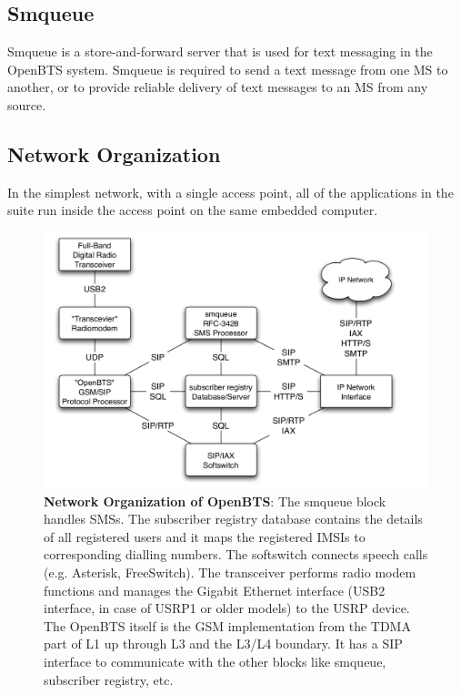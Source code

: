 \subsection{Smqueue}
Smqueue is a store-and-forward server that is used for text messaging in the OpenBTS system. Smqueue is required to send a text message from one MS to another, or to provide reliable delivery of text messages to an MS from any source.

\subsection{Network Organization}
In the simplest network, with a single access point, all of the applications in the suite run inside the access point on the same embedded computer.



\begin{figure}[h]
\centering
\includegraphics[width=1\textwidth]{networkOrg}
\caption[Network Organization of OpenBTS]{\textbf{Network Organization of OpenBTS}: The smqueue block handles SMSs. 
The subscriber registry database contains the details of all registered users and it
maps the registered IMSIs to corresponding dialling numbers. The softswitch connects 
speech calls (e.g. Asterisk, FreeSwitch). The transceiver performs radio modem
functions and manages the Gigabit Ethernet interface (USB2 interface, in case
of USRP1 or older models) to the USRP device. The OpenBTS itself is the GSM 
implementation from the TDMA part of L1 up through L3 and the L3/L4 boundary. 
It has a SIP interface to communicate with the other blocks like smqueue, subscriber 
registry, etc.
}
\label{networkOrg}
\end{figure}




















